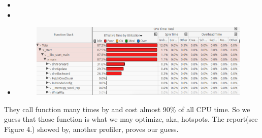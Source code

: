 \documentclass{article}
\begin{document}
\begin{itemize}[noitemsep,topsep=\mdcompacttopsep]%

\item{}%

\item{}%

\item{}

\begin{figure}[tbp]%
\begin{mdcenter}%

\noindent{}\includegraphics[keepaspectratio=true,width=\dimmin{}{\dimwidth{0.90}}]{images/2016-02-19-10-36-25-}{}%

\mdhr{}%

\noindent{}%
\end{mdcenter}\label{fig-myfigure}%
\end{figure}%
\end{itemize}%

\noindent{}They call  function  many times by  and 
cost almost 90\% of all CPU time. So we guess that those function
 is what we may optimize, aka, hotspots.
The report(see Figure 4.) showed by, another profiler, proves our guess.%
\end{document}
